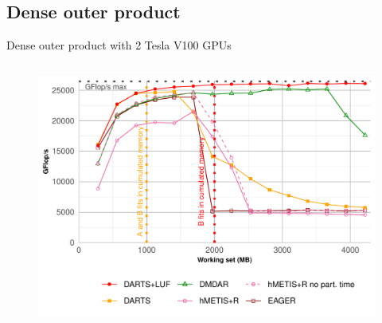 \documentclass{libs/ufc_format}
\begin{document}
\subsection{Dense outer product}
\begin{frame}{Dense outer product with 2 Tesla V100 GPUs}
    \begin{columns}{}
        \begin{column}{0.5\textwidth}
	\begin{figure}
		\center\includegraphics[scale = 0.3]{Images/GF_dynamic_data_aware_no_hfp_gemini-2-ipdps_2GPU.pdf}
	\end{figure}
	\end{column}


\end{columns}
\end{frame}
\end{document}
